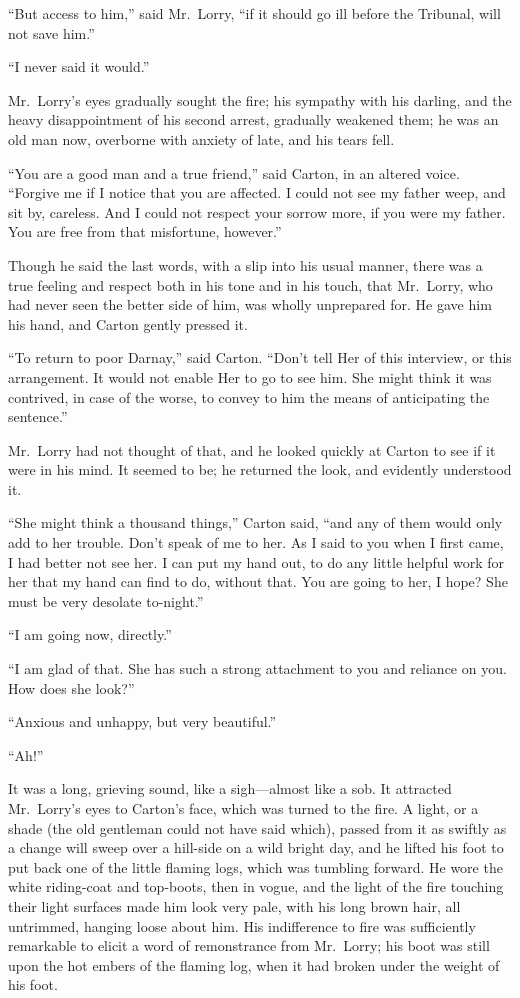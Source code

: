 ``But access to him,'' said Mr.\ Lorry, ``if it should go ill before the
Tribunal, will not save him.''

``I never said it would.''

Mr.\ Lorry's eyes gradually sought the fire; his sympathy with his
darling, and the heavy disappointment of his second arrest, gradually
weakened them; he was an old man now, overborne with anxiety of late,
and his tears fell.

``You are a good man and a true friend,'' said Carton, in an altered
voice.  ``Forgive me if I notice that you are affected.  I could not
see my father weep, and sit by, careless.  And I could not respect
your sorrow more, if you were my father.  You are free from that
misfortune, however.''

Though he said the last words, with a slip into his usual manner,
there was a true feeling and respect both in his tone and in his
touch, that Mr.\ Lorry, who had never seen the better side of him,
was wholly unprepared for.  He gave him his hand, and Carton gently
pressed it.

``To return to poor Darnay,'' said Carton.  ``Don't tell Her of this
interview, or this arrangement.  It would not enable Her to go to see
him. She might think it was contrived, in case of the worse, to
convey to him the means of anticipating the sentence.''

Mr.\ Lorry had not thought of that, and he looked quickly at Carton to
see if it were in his mind.  It seemed to be; he returned the look,
and evidently understood it.

``She might think a thousand things,'' Carton said, ``and any of them
would only add to her trouble.  Don't speak of me to her.  As I said
to you when I first came, I had better not see her.  I can put my
hand out, to do any little helpful work for her that my hand can find
to do, without that. You are going to her, I hope?  She must be very
desolate to-night.''

``I am going now, directly.''

``I am glad of that.  She has such a strong attachment to you and
reliance on you.  How does she look?''

``Anxious and unhappy, but very beautiful.''

``Ah!''

It was a long, grieving sound, like a sigh---almost like a sob.  It
attracted Mr.\ Lorry's eyes to Carton's face, which was turned to the
fire.  A light, or a shade (the old gentleman could not have said
which), passed from it as swiftly as a change will sweep over a
hill-side on a wild bright day, and he lifted his foot to put back
one of the little flaming logs, which was tumbling forward.  He wore
the white riding-coat and top-boots, then in vogue, and the light of
the fire touching their light surfaces made him look very pale, with
his long brown hair, all untrimmed, hanging loose about him.  His
indifference to fire was sufficiently remarkable to elicit a word of
remonstrance from Mr.\ Lorry; his boot was still upon the hot embers
of the flaming log, when it had broken under the weight of his foot.

